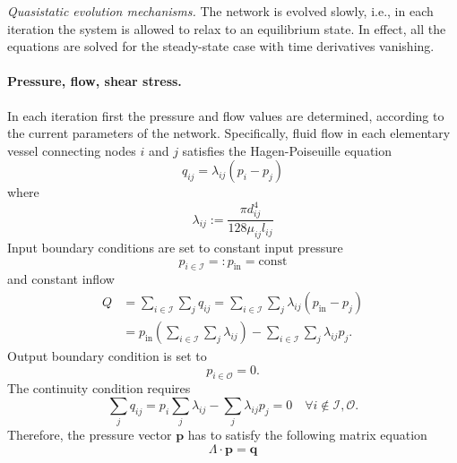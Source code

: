 \documentclass[aps,pra,a4paper,twocolumn,10pt,superscriptaddress,longbibliography]{revtex4-1}
\renewcommand{\t}[1]{\text{#1}}
\newcommand{\mat}[1]{\bm{\mathit{#1}}}
\begin{document}
\emph{Quasistatic evolution mechanisms.} 
The network is evolved slowly, i.e., in each iteration the system is allowed to relax to an equilibrium state. In effect, all the equations are solved for the steady-state case with time derivatives vanishing.
%
\paragraph{Pressure, flow, shear stress.}
In each iteration first the pressure and flow values are determined, according to the current parameters of the network. Specifically, fluid flow in each elementary vessel connecting nodes $i$ and $j$ satisfies the Hagen-Poiseuille equation
\begin{equation}
\label{eq:hagen-poiseuillie}
q_{ij} = \lambda_{ij} (p_i - p_j)
\end{equation}
where
\begin{equation}
\lambda_{ij} := \frac{\pi d_{ij}^4}{128 \mu_{ij} l_{ij}}
\end{equation}
Input boundary conditions are set to constant input pressure
\begin{equation}
p_{i \in \mathcal{I}} =: p_\t{in} = \mathrm{const}
\end{equation}
and constant inflow
\begin{equation}
\begin{aligned}
Q &= \sum_{i \in \mathcal{I}} \sum_{j} q_{ij} = \sum_{i \in \mathcal{I}} \sum_{j} \lambda_{ij} (p_\t{in} - p_j) \\ &= p_\t{in} \left( \sum_{i \in \mathcal{I}} \sum_{j} \lambda_{ij} \right) - \sum_{i \in \mathcal{I}} \sum_{j} \lambda_{ij} p_j.
\end{aligned}
\end{equation}
Output boundary condition is set to
\begin{equation}
p_{i \in \mathcal{O}} = 0.
\end{equation}
The continuity condition requires
\begin{equation}
\sum_{j} q_{ij} = p_i \sum_{j} \lambda_{ij} - \sum_{j} \lambda_{ij} p_j = 0 \quad \forall i \not\in \mathcal{I}, \mathcal{O}.
\end{equation}
Therefore, the pressure vector $\mathbf{p}$ has to satisfy the following matrix equation
\begin{equation}
\mat{\Lambda} \cdot \mathbf{p} = \mathbf{q}
\end{equation}
\end{document}
